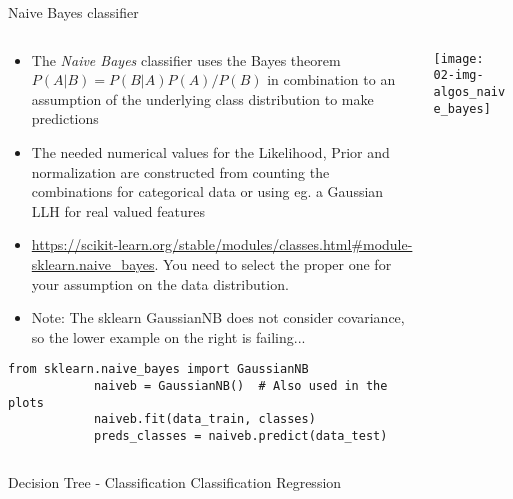   \begin{frame}[fragile]{Naive Bayes classifier}
    \begin{columns}
      \begin{column}{0.65\textwidth}
        \begin{itemize}
          \item The \emph{Naive Bayes} classifier uses the Bayes theorem $P(A|B) = P(B|A)P(A)/P(B)$ in combination to an assumption of the underlying class distribution to make predictions
          \item The needed numerical values for the Likelihood, Prior and normalization are constructed from counting the combinations for categorical data or using eg. a Gaussian LLH for real valued features
          \item \small\url{https://scikit-learn.org/stable/modules/classes.html#module-sklearn.naive_bayes}.
          You need to select the proper one for your assumption on the data distribution.
          \item Note: The sklearn GaussianNB does not consider covariance, so the lower example on the right is failing...
        \end{itemize}
        \begin{mdframed}
          \begin{lstlisting}[style=dark, gobble=10, title=\lsttitlelight{LDA classification [Note: example shortened]}]
            from sklearn.naive_bayes import GaussianNB
            naiveb = GaussianNB()  # Also used in the plots
            naiveb.fit(data_train, classes)
            preds_classes = naiveb.predict(data_test)
          \end{lstlisting}
        \end{mdframed}
      \end{column}
      \begin{column}{0.35\textwidth}
        \vspace{1em}

        \texttt{[image: 02-img-algos\_naive\_bayes]}
      \end{column}
    \end{columns}
  \end{frame}

  \begin{frame}{Decision Tree - Classification}
  Classification
  Regression
  \end{frame}

